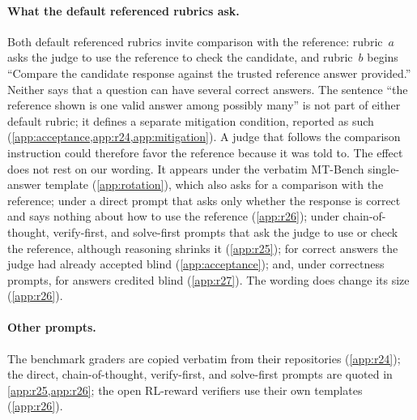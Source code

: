 \paragraph{What the default referenced rubrics ask.}
Both default referenced rubrics invite comparison with the reference: rubric~$a$ asks the judge to use the reference to check the candidate, and rubric~$b$ begins ``Compare the candidate response against the trusted reference answer provided.'' Neither says that a question can have several correct answers. The sentence ``the reference shown is one valid answer among possibly many'' is not part of either default rubric; it defines a separate mitigation condition, reported as such (\cref{app:acceptance,app:r24,app:mitigation}). A judge that follows the comparison instruction could therefore favor the reference because it was told to. The effect does not rest on our wording. It appears under the verbatim MT-Bench single-answer template (\cref{app:rotation}), which also asks for a comparison with the reference; under a direct prompt that asks only whether the response is correct and says nothing about how to use the reference (\cref{app:r26}); under chain-of-thought, verify-first, and solve-first prompts that ask the judge to use or check the reference, although reasoning shrinks it (\cref{app:r25}); for correct answers the judge had already accepted blind (\cref{app:acceptance}); and, under correctness prompts, for answers credited blind (\cref{app:r27}). The wording does change its size (\cref{app:r26}).

\paragraph{Other prompts.}
The benchmark graders are copied verbatim from their repositories (\cref{app:r24}); the direct, chain-of-thought, verify-first, and solve-first prompts are quoted in \cref{app:r25,app:r26}; the open RL-reward verifiers use their own templates (\cref{app:r26}).

